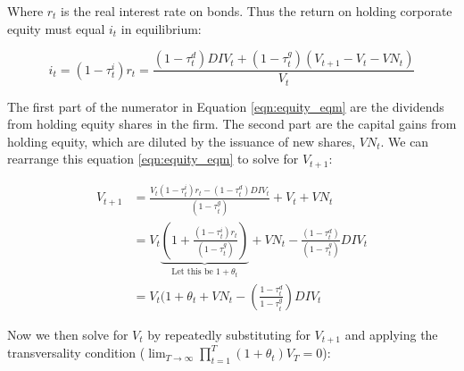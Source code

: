 \noindent\noindent Where $r_{t}$ is the real interest rate on bonds.  Thus the return on holding corporate equity must equal $i_{t}$ in equilibrium:

\begin{equation}
\label{eqn:equity_eqm}
i_{t}=(1-\tau^{i}_{t})r_{t}=\frac{(1-\tau^{d}_{t})DIV_{t}+(1-\tau^{g}_{t})(V_{t+1}-V_{t}-VN_{t})}{V_{t}}
\end{equation}

The first part of the numerator in Equation \ref{eqn:equity_eqm} are the dividends from holding equity shares in the firm.  The second part are the capital gains from holding equity, which are diluted by the issuance of new shares, $VN_{t}$.  We can rearrange this equation \ref{eqn:equity_eqm} to solve for $V_{t+1}$:

\begin{equation}
\label{eqn:v_t1}
\begin{split}
V_{t+1}&=\frac{V_{t}(1-\tau^{i}_{t})r_{t}-(1-\tau^{d}_{t})DIV_{t}}{(1-\tau^{g}_{t})}+V_{t}+VN_{t} \\
 & = V_{t}\underbrace{\left(1+\frac{(1-\tau^{i}_{t})r_{t}}{(1-\tau^{g}_{t})}\right)}_{\text{Let this be }1+\theta_{t}} + VN_{t} - \frac{(1-\tau^{d}_{t})}{(1-\tau^{g}_{t})}DIV_{t} \\
 & = V_{t}(1+\theta_{t} + VN_{t} - \left(\frac{1-\tau^{d}_{t}}{1-\tau^{g}_{t}}\right)DIV_{t}
\end{split}
\end{equation}

\noindent\noindent Now we then solve for $V_{t}$ by repeatedly substituting for $V_{t+1}$ and applying the transversality condition ($\lim_{T \to \infty} \prod_{t=1}^{T}(1+\theta_{t})V_{T}=0$):

